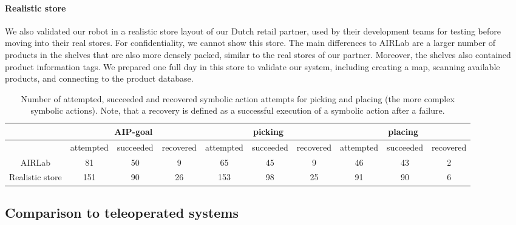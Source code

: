 \paragraph{Realistic store}
We also validated our robot in a realistic store layout of our Dutch retail partner, used by their development teams for testing before moving into their real stores.  
For confidentiality, we cannot show this store.
The main differences to AIRLab are a larger number of products in the shelves that are also more densely packed, similar to the real stores of our partner.
Moreover, the shelves also contained product information tags. 
We prepared one full day in this store to validate our system, including creating a map, scanning available products, and connecting to the product database.
\begin{table*}[t]
    \centering
    \caption{Number of attempted, succeeded and recovered
    symbolic action attempts for picking and placing
    (the more complex symbolic actions). Note, that a recovery is
    defined as a successful execution of a symbolic action after a
    failure.
    }
    \label{tab:recoveries}
    \begin{tabular}{c|ccc|ccc|ccc}
        \toprule
         & \multicolumn{3}{c}{AIP-goal} &
        \multicolumn{3}{c}{picking} &
        \multicolumn{3}{c}{placing} \\
        \midrule
        & attempted & succeeded & recovered & attempted & succeeded & recovered & attempted & succeeded & recovered \\
        AIRLab & 81 & 50 & 9 & 65 & 45 & 9 & 46 & 43 & 2 \\
        Realistic store & 151 &  90 & 26 & 153 & 98 & 25 &
        91 & 90 & 6 \\
        \bottomrule
    \end{tabular}   
\end{table*}
%
\subsection{Comparison to teleoperated systems}

